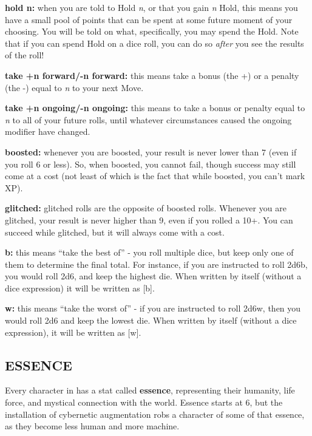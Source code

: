 \documentclass[oneside,10pt]{article}
\begin{document}
\begin{multicols}{2}
\begin{adjustwidth*}{.5cm}{.5cm}
\textbf{hold n:} when you are told to Hold \textit{n}, or that you gain \textit{n} 
Hold, this means you have a small pool of points that can 
be spent at some future moment of your choosing. You 
will be told on what, specifically, you may spend the Hold. 
Note that if you can spend Hold on a dice roll, you can do 
so \textit{after} you see the results of the roll! 

\textbf{take +n forward/-n forward:} this means take a bonus
(the +) or a penalty (the -) equal to \textit{n} to your
next Move.

\textbf{take +n ongoing/-n ongoing:} this means to take a bonus or penalty equal to \textit{n} to all of your future rolls, until
whatever circumstances caused the ongoing modifier have
changed.

\textbf{boosted:} whenever you are boosted, your result is never
lower than 7 (even if you roll 6 or less). So, when boosted,
you cannot fail, though success may still come at a cost
(not least of which is the fact that while boosted, you can’t
mark XP).

\textbf{glitched:} glitched rolls are the opposite of boosted rolls.
Whenever you are glitched, your result is never higher
than 9, even if you rolled a 10+. You can succeed while
glitched, but it will always come with a cost.

\textbf{b:} this means “take the best of” - you roll multiple dice,
but keep only one of them to determine the final total.
For instance, if you are instructed to roll 2d6b, you would
roll 2d6, and keep the highest die. When written by itself
(without a dice expression) it will be written as
[b].

\textbf{w:} this means “take the worst of” - if you are instructed to
roll 2d6w, then you would roll 2d6 and keep the lowest
die. When written by itself (without a dice expression), it
will be written as [w].

\end{adjustwidth*}

\subsection{ESSENCE}
Every character in \SW{}  has a stat called \textbf{essence},
representing their humanity, life force, and mystical connection with the world. Essence starts at 6, but the installation
of cybernetic augmentation robs a character of some of that
essence, as they become less human and more
machine.


\end{multicols}
\end{document}
